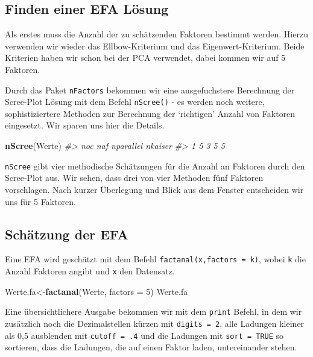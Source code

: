 \documentclass[12pt,ngerman,]{book}
\makeatletter
\newenvironment{Shaded}{\begin{snugshade}}{\end{snugshade}}
\newcommand{\KeywordTok}[1]{\textcolor[rgb]{0.13,0.29,0.53}{\textbf{{#1}}}}
\newcommand{\DataTypeTok}[1]{\textcolor[rgb]{0.13,0.29,0.53}{{#1}}}
\newcommand{\DecValTok}[1]{\textcolor[rgb]{0.00,0.00,0.81}{{#1}}}
\newcommand{\CommentTok}[1]{\textcolor[rgb]{0.56,0.35,0.01}{\textit{{#1}}}}
\newcommand{\NormalTok}[1]{{#1}}
\newenvironment{kframe}{%
\medskip{}
\setlength{\fboxsep}{.8em}
 \def\at@end@of@kframe{}%
 \ifinner\ifhmode%
  \def\at@end@of@kframe{\end{minipage}}%
  \begin{minipage}{\columnwidth}%
 \fi\fi%
 \def\FrameCommand##1{\hskip\@totalleftmargin \hskip-\fboxsep
 \colorbox{shadecolor}{##1}\hskip-\fboxsep
     \hskip-\linewidth \hskip-\@totalleftmargin \hskip\columnwidth}%
 \MakeFramed {\advance\hsize-\width
   \@totalleftmargin\z@ \linewidth\hsize
   \@setminipage}}%
 {\par\unskip\endMakeFramed%
 \at@end@of@kframe}
\renewenvironment{Shaded}{\begin{kframe}}{\end{kframe}}
\theoremstyle{definition}
\theoremstyle{definition}
\theoremstyle{remark}
\makeatother
\begin{document}
\subsection{Finden einer EFA Lösung}\label{finden-einer-efa-losung}

Als erstes muss die Anzahl der zu schätzenden Faktoren bestimmt werden.
Hierzu verwenden wir wieder das Ellbow-Kriterium und das
Eigenwert-Kriterium. Beide Kriterien haben wir schon bei der PCA
verwendet, dabei kommen wir auf 5 Faktoren.

Durch das Paket \texttt{nFactors} bekommen wir eine ausgefuchstere
Berechnung der Scree-Plot Lösung mit dem Befehl \texttt{nScree()} - es
werden noch weitere, sophistiziertere Methoden zur Berechnung der
`richtigen' Anzahl von Faktoren eingesetzt. Wir sparen uns hier die
Details.

\begin{Shaded}
\begin{Highlighting}[]
\KeywordTok{nScree}\NormalTok{(Werte)}
\CommentTok{#>   noc naf nparallel nkaiser}
\CommentTok{#> 1   5   3         5       5}
\end{Highlighting}
\end{Shaded}

\texttt{nScree} gibt vier methodische Schätzungen für die Anzahl an
Faktoren durch den Scree-Plot aus. Wir sehen, dass drei von vier
Methoden fünf Faktoren vorschlagen. Nach kurzer Überlegung und Blick aus
dem Fenster entscheiden wir uns für 5 Faktoren.

\subsection{Schätzung der EFA}\label{schatzung-der-efa}

Eine EFA wird geschätzt mit dem Befehl
\texttt{factanal(x,factors\ =\ k)}, wobei \texttt{k} die Anzahl Faktoren
angibt und \texttt{x} den Datensatz.

\begin{Shaded}
\begin{Highlighting}[]
\NormalTok{Werte.fa<-}\KeywordTok{factanal}\NormalTok{(Werte, }\DataTypeTok{factors =} \DecValTok{5}\NormalTok{)}
\NormalTok{Werte.fa}
\end{Highlighting}
\end{Shaded}

Eine übersichtlichere Ausgabe bekommen wir mit dem \texttt{print}
Befehl, in dem wir zusätzlich noch die Dezimalstellen kürzen mit
\texttt{digits\ =\ 2}, alle Ladungen kleiner als 0,5 ausblenden mit
\texttt{cutoff\ =\ .4} und die Ladungen mit \texttt{sort\ =\ TRUE} so
sortieren, dass die Ladungen, die auf einen Faktor laden, untereinander
stehen.
\end{document}
